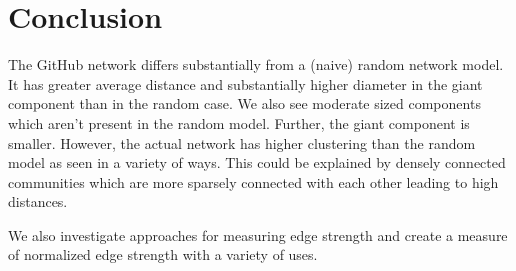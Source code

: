 \documentclass{pset}
\begin{document}
\section*{Conclusion}

The GitHub network differs substantially from a (naive) random network model.
It has
greater average distance and substantially higher diameter in the giant
component than in the random case. We also see moderate sized components which
aren't present in the random model. Further, the giant component is smaller. However,
the actual network has higher clustering  than the random model as seen in
a variety of ways. This could be explained by densely connected communities
which are more sparsely connected with each other leading to high distances. 

We also investigate approaches for measuring edge strength and create
a measure of normalized edge strength with a variety of uses.

\printbibliography{}
\end{document}
